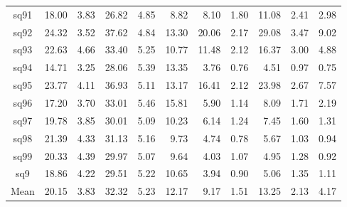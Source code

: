 {\begin{longtable}{@{}cr@{\hspace{1em}}r@{\hspace{1em}}r@{\hspace{1em}}r@{\hspace{1em}}r@{\hspace{2em}}r@{\hspace{1em}}r@{\hspace{1em}}r@{\hspace{1em}}r@{\hspace{1em}}r@{}}
sq91&18.00&3.83&26.82&4.85&8.82&8.10&1.80&11.08&2.41&2.98\\
sq92&24.32&3.52&37.62&4.84&13.30&20.06&2.17&29.08&3.47&9.02\\
sq93&22.63&4.66&33.40&5.25&10.77&11.48&2.12&16.37&3.00&4.88\\
sq94&14.71&3.25&28.06&5.39&13.35&3.76&0.76&4.51&0.97&0.75\\
sq95&23.77&4.11&36.93&5.11&13.17&16.41&2.12&23.98&2.67&7.57\\
sq96&17.20&3.70&33.01&5.46&15.81&5.90&1.14&8.09&1.71&2.19\\
sq97&19.78&3.85&30.01&5.09&10.23&6.14&1.24&7.45&1.60&1.31\\
sq98&21.39&4.33&31.13&5.16&9.73&4.74&0.78&5.67&1.03&0.94\\
sq99&20.33&4.39&29.97&5.07&9.64&4.03&1.07&4.95&1.28&0.92\\
sq9&18.86&4.22&29.51&5.22&10.65&3.94&0.90&5.06&1.35&1.11\\
\midrule
Mean&20.15&3.83&32.32&5.23&12.17&9.17&1.51&13.25&2.13&4.17\\
\bottomrule
\end{longtable}}

